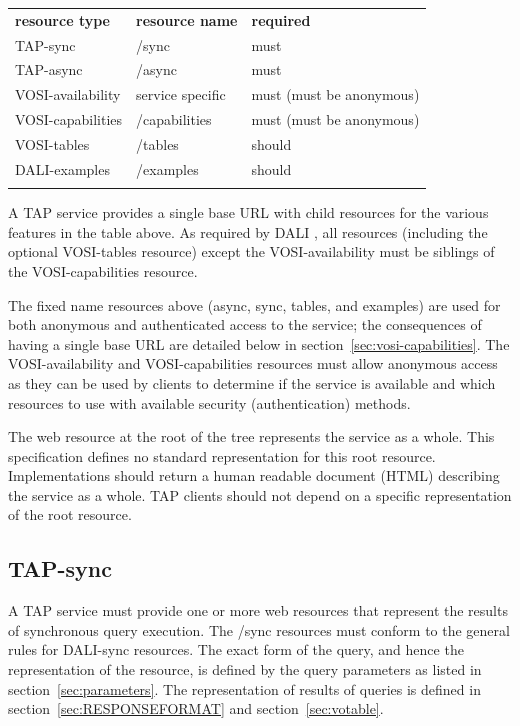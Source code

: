 \documentclass[11pt,letter]{ivoa}
\begin{document}
\medskip
\begin{inlinetable}
\begin{tabular}{l l l}
\sptablerule
\textbf{resource type} & \textbf{resource name} & \textbf{required} \\
\sptablerule
TAP-sync & /sync & must \\
TAP-async & /async & must \\
VOSI-availability & service specific & must (must be anonymous) \\
VOSI-capabilities & /capabilities & must (must be anonymous) \\
VOSI-tables & /tables & should \\
DALI-examples & /examples & should \\
\sptablerule
\end{tabular}
\end{inlinetable}
\medskip

A TAP service provides a single base URL with child resources for the various features in the table above. 
As required by DALI \citep{2017ivoa.spec.0517D}, all resources (including the optional VOSI-tables 
resource) except the VOSI-availability must be siblings of the VOSI-capabilities resource.

The fixed name resources above (async, sync, tables, and examples) are used for both anonymous and 
authenticated access to the service; the consequences of having a single base URL are detailed below in 
section~\ref{sec:vosi-capabilities}. The VOSI-availability and VOSI-capabilities resources must allow anonymous access as they can be used by clients to determine if the service is available and which resources to use with
available security (authentication) methods.

The web resource at the root of the tree represents the service as a whole. 
This specification defines no standard representation for this root resource. 
Implementations should return a human readable document (HTML) describing 
the service as a whole. TAP clients should not depend on a specific representation 
of the root resource.

\subsection{TAP-sync}
\label{sec:tap-sync}

A TAP service must provide one or more web resources that represent the results 
of synchronous query execution. The /sync resources must conform to the general rules for
DALI-sync  resources. The exact form of the query, and hence the 
representation of the resource, is defined by the  query parameters as listed in 
section~\ref{sec:parameters}. The representation of results of queries is defined in 
section~\ref{sec:RESPONSEFORMAT} and section~\ref{sec:votable}.
\end{document}
